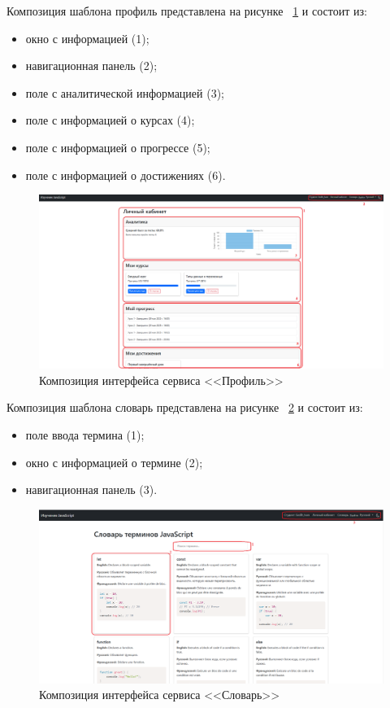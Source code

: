 Композиция шаблона профиль представлена на рисунке ~\ref{templ:image9} и состоит из:

\begin{itemize}
	\item окно с информацией (1);
	\item навигационная панель (2);
	\item поле с аналитической информацией (3);
	\item поле с информацией о курсах (4);
	\item поле с информацией о прогрессе (5);
	\item поле с информацией о достижениях (6).
\end{itemize}

\begin{figure}[h]
	\centering
	\includegraphics[width=1\linewidth]{images/профиль}
	\caption{Композиция интерфейса сервиса <<Профиль>>}
	\label{templ:image9}
\end{figure}

Композиция шаблона словарь представлена на рисунке ~\ref{templ:image10} и состоит из:

\begin{itemize}
	\item поле ввода термина (1);
	\item окно с информацией о термине (2);
	\item навигационная панель (3).
\end{itemize}

\begin{figure}[h]
	\centering
	\includegraphics[width=1\linewidth]{images/словарь}
	\caption{Композиция интерфейса сервиса <<Словарь>>}
	\label{templ:image10}
\end{figure}

